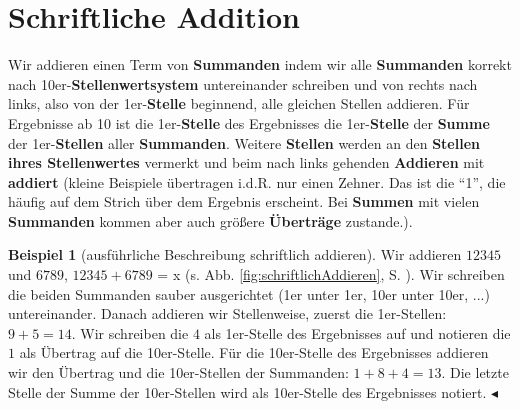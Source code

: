 \documentclass[a4paper]{book}%
\newcommand{\topicend}{
      $\blacktriangleleft$
}
\theoremstyle{definition}
\newtheorem{beispiel}{Beispiel}
\begin{document}
\section{Schriftliche Addition}

Wir addieren einen Term von \textbf{Summanden} indem wir alle \textbf{Summanden} korrekt nach 10er-\textbf{Stellenwertsystem} untereinander schreiben und von rechts nach links, also von der 1er-\textbf{Stelle} beginnend, alle gleichen Stellen addieren. Für Ergebnisse ab 10 ist die 1er-\textbf{Stelle} des Ergebnisses die 1er-\textbf{Stelle} der \textbf{Summe} der 1er-\textbf{Stellen} aller \textbf{Summanden}. Weitere \textbf{Stellen} werden an den \textbf{Stellen ihres Stellenwertes} vermerkt und beim nach links gehenden \textbf{Addieren} mit \textbf{addiert} (kleine Beispiele übertragen i.d.R. nur einen Zehner. Das ist die  \enquote{1}, die häufig auf dem Strich über dem Ergebnis erscheint. Bei \textbf{Summen} mit vielen \textbf{Summanden} kommen aber auch größere \textbf{Überträge} zustande.).

\begin{beispiel}[ausführliche Beschreibung schriftlich addieren]
    Wir addieren $12345$ und $6789$, $12345 + 6789$ = x (s. Abb. \ref{fig:schriftlichAddieren}, S. \pageref{fig:schriftlichAddieren}). Wir schreiben die beiden Summanden sauber ausgerichtet (1er unter 1er, 10er unter 10er, ...) untereinander.  Danach addieren wir Stellenweise, zuerst die 1er-Stellen: $9+5=14$. Wir schreiben die $4$ als 1er-Stelle des Ergebnisses auf und notieren die $1$ als Übertrag auf die 10er-Stelle. Für die 10er-Stelle des Ergebnisses addieren wir den Übertrag und die 10er-Stellen der Summanden: $1+8+4=13$. Die letzte Stelle der Summe der 10er-Stellen wird als 10er-Stelle des Ergebnisses notiert.\topicend
\end{beispiel}
\end{document}
